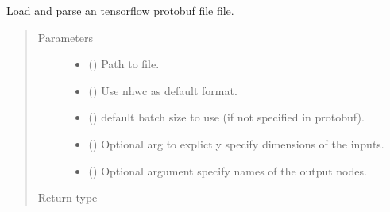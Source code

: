\documentclass[letterpaper,10pt,english]{sphinxmanual}
\begin{document}
\begin{fulllineitems}
\label{\detokenize{reference/py:migraphx.parse_tf}}
\sphinxAtStartPar
Load and parse an tensorflow protobuf file file.
\begin{quote}\begin{description}
\item[{Parameters}] \leavevmode\begin{itemize}
\item {} 
\sphinxAtStartPar
{} () \textendash{} Path to file.

\item {} 
\sphinxAtStartPar
{} () \textendash{} Use nhwc as default format.

\item {} 
\sphinxAtStartPar
{} () \textendash{} default batch size to use (if not specified in protobuf).

\item {} 
\sphinxAtStartPar
{} (\sphinxstyleliteralemphasis{\sphinxupquote{{[}}}\sphinxstyleliteralemphasis{\sphinxupquote{, }}\sphinxstyleliteralemphasis{\sphinxupquote{{[}}}\sphinxstyleliteralemphasis{\sphinxupquote{{]}}}\sphinxstyleliteralemphasis{\sphinxupquote{{]}}}) \textendash{} Optional arg to explictly specify dimensions of the inputs.

\item {} 
\sphinxAtStartPar
{} (\sphinxstyleliteralemphasis{\sphinxupquote{{[}}}\sphinxstyleliteralemphasis{\sphinxupquote{{]}}}) \textendash{} Optional argument specify names of the output nodes.

\end{itemize}

\item[{Return type}] \leavevmode
\sphinxAtStartPar
{\hyperref[\detokenize{reference/py:migraphx.program}]{}}

\end{description}\end{quote}

\end{fulllineitems}
\end{document}
